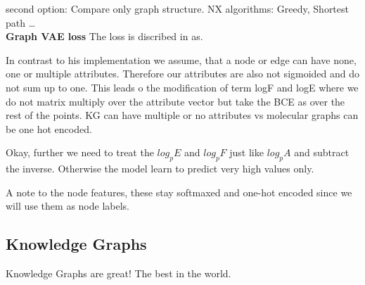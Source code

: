 second option: \leavevmode
Compare only graph structure. 
NX algorithms: Greedy, Shortest path \dots
\\
\textbf{Graph VAE loss}\leavevmode
The loss is discribed in \cite{simonovsky_graphvae_2018} as.

In contrast to his implementation we assume, that a node or edge can have none, one or multiple attributes. Therefore our attributes are also not sigmoided and do not sum up to one. This leads o the modification of term logF and logE where we do not matrix multiply over the attribute vector but take the BCE as over the rest of the points.
KG can have multiple or no attributes vs molecular graphs can be one hot encoded.

Okay, further we need to treat the $log_pE$ and $log_pF$ just like $log_pA$ and subtract the inverse. Otherwise the model learn to predict very high values only. 

A note to the node features, these stay softmaxed and one-hot encoded since we will use them as node labels.

\subsection{Knowledge Graphs}

Knowledge Graphs are great! The best in the world.
